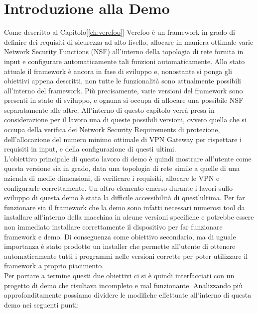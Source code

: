 \section{Introduzione alla Demo}
Come descritto al Capitolo[\ref{ch:verefoo}] Verefoo è un framework in grado di definire dei requisiti di sicurezza ad alto livello, allocare in maniera ottimale varie Network Security Functions (NSF) all'interno della topologia di rete fornita in input e configurare automaticamente tali funzioni 
automaticamente. Allo stato attuale il framework è ancora in fase di sviluppo e, nonostante si ponga gli obiettivi appena descritti, non tutte le funzionalità sono attualmente possibili all'interno del framework. Più precisamente, varie versioni del framework sono presenti in stato di sviluppo, e ognuna si occupa di allocare una possibile NSF separatamente alle altre.
All'interno di questo capitolo verrà presa in considerazione per il lavoro una di queste possibili versioni, ovvero quella che si occupa della verifica dei Network Security Requirements di protezione, dell'allocazione del numero minimo ottimale di VPN Gateway per rispettare i requisiti in input, e della configurazione di questi ultimi.\\
L'obiettivo principale di questo lavoro di demo è quindi mostrare all'utente come questa versione sia in grado, data una topologia di rete simile a quelle di una azienda di medie dimensioni, di verificare i requisiti, allocare le VPN e configurarle correttamente.
\newpage
Un altro elemento emerso durante i lavori sullo sviluppo di questa demo è stata la difficile accessibilità di quest'ultima. Per far funzionare sia il framework che la demo sono infatti necessari numerosi tool da installare all'interno della macchina in alcune versioni specifiche e potrebbe essere non immediato installare correttamente il dispositivo per far funzionare 
framework e demo. Di conseguenza come obiettivo secondario, ma di uguale importanza è stato prodotto un installer che permette all'utente di ottenere automaticamente tutti i programmi nelle versioni corrette per poter utilizzare il framework a proprio piacimento.
\\
Per portare a termine questi due obiettivi ci si è quindi interfacciati con un progetto di demo che risultava incompleto e mal funzionante. Analizzando più approfonditamente possiamo dividere le modifiche effettuate all'interno di questa demo nei seguenti punti:

